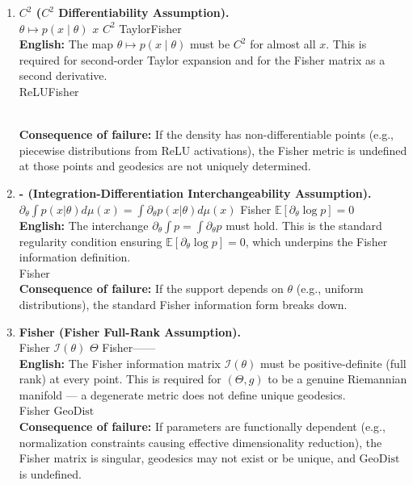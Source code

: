 \documentclass{article}
\newcommand{\GeoDist}{\mathrm{GeoDist}}
\newcommand{\Fisher}{\mathcal{I}}
\newcommand{\E}{\mathbb{E}}
\begin{document}
\begin{enumerate}[label=\textbf{H\arabic*:}, leftmargin=*, itemsep=0.8em]
    \item \textbf{$C^2$  ($C^2$ Differentiability Assumption).} \\
    \textbf{}  $\theta \mapsto p(x \mid \theta)$  $x$  $C^2$ 
    TaylorFisher
    \\[0.3em]
    \textbf{English:} The map $\theta \mapsto p(x \mid \theta)$ must be $C^2$ for almost all $x$.
    This is required for second-order Taylor expansion and for the Fisher matrix as a second derivative.
    \\[0.3em]
    \textbf{} ReLUFisher
    
    \\[0.3em]
    \textbf{Consequence of failure:} If the density has non-differentiable points (e.g., piecewise
    distributions from ReLU activations), the Fisher metric is undefined at those points and
    geodesics are not uniquely determined.

    \item \textbf{- (Integration-Differentiation Interchangeability Assumption).} \\
    \textbf{} $\partial_\theta \int p(x|\theta) d\mu(x) = \int \partial_\theta p(x|\theta) d\mu(x)$
    Fisher $\E[\partial_\theta \log p] = 0$
    \\[0.3em]
    \textbf{English:} The interchange $\partial_\theta \int p = \int \partial_\theta p$ must hold.
    This is the standard regularity condition ensuring $\E[\partial_\theta \log p] = 0$, which
    underpins the Fisher information definition.
    \\[0.3em]
    \textbf{} Fisher
    \\[0.3em]
    \textbf{Consequence of failure:} If the support depends on $\theta$ (e.g., uniform distributions),
    the standard Fisher information form breaks down.

    \item \textbf{Fisher (Fisher Full-Rank Assumption).} \\
    \textbf{} Fisher $\Fisher(\theta)$ 
     $\Theta$ Fisher——
    \\[0.3em]
    \textbf{English:} The Fisher information matrix $\Fisher(\theta)$ must be positive-definite
    (full rank) at every point. This is required for $(\Theta, g)$ to be a genuine Riemannian
    manifold — a degenerate metric does not define unique geodesics.
    \\[0.3em]
    \textbf{} Fisher
    $\GeoDist$ 
    \\[0.3em]
    \textbf{Consequence of failure:} If parameters are functionally dependent (e.g., normalization
    constraints causing effective dimensionality reduction), the Fisher matrix is singular,
    geodesics may not exist or be unique, and $\GeoDist$ is undefined.


\end{enumerate}
\end{document}
